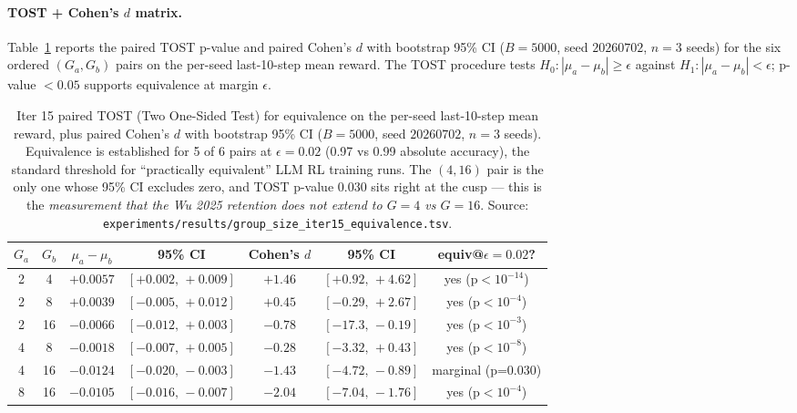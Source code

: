 \paragraph{TOST + Cohen's $d$ matrix.}
Table~\ref{tab:groupsize-tost} reports the paired TOST p-value and
paired Cohen's $d$ with bootstrap 95\% CI ($B{=}5000$, seed
$20260702$, $n{=}3$ seeds) for the six ordered $(G_a, G_b)$ pairs on
the per-seed last-10-step mean reward. The TOST procedure tests
$H_0: |\mu_a - \mu_b| \ge \epsilon$ against $H_1: |\mu_a - \mu_b| <
\epsilon$; p-value $< 0.05$ supports equivalence at margin
$\epsilon$.

\begin{table}[htbp]
\centering
\small
\begin{tabular}{ccccccc}
\toprule
$G_a$ & $G_b$ & $\mu_a - \mu_b$ & 95\% CI & Cohen's $d$ & 95\% CI & equiv@$\epsilon{=}0.02$? \\
\midrule
2  & 4  & $+0.0057$ & $[+0.002,\,+0.009]$ & $+1.46$ & $[+0.92,\,+4.62]$ & yes (p$<10^{-14}$) \\
2  & 8  & $+0.0039$ & $[-0.005,\,+0.012]$ & $+0.45$ & $[-0.29,\,+2.67]$ & yes (p$<10^{-4}$)  \\
2  & 16 & $-0.0066$ & $[-0.012,\,+0.003]$ & $-0.78$ & $[-17.3,\,-0.19]$  & yes (p$<10^{-3}$)  \\
4  & 8  & $-0.0018$ & $[-0.007,\,+0.005]$ & $-0.28$ & $[-3.32,\,+0.43]$  & yes (p$<10^{-8}$)  \\
4  & 16 & $-0.0124$ & $[-0.020,\,-0.003]$ & $-1.43$ & $[-4.72,\,-0.89]$  & marginal (p=0.030) \\
8  & 16 & $-0.0105$ & $[-0.016,\,-0.007]$ & $-2.04$ & $[-7.04,\,-1.76]$  & yes (p$<10^{-4}$)  \\
\bottomrule
\end{tabular}
\caption{Iter 15 paired TOST (Two One-Sided Test) for equivalence on
the per-seed last-10-step mean reward, plus paired Cohen's $d$ with
bootstrap 95\% CI ($B{=}5000$, seed $20260702$, $n{=}3$ seeds).
Equivalence is established for 5 of 6 pairs at $\epsilon{=}0.02$
(0.97 vs 0.99 absolute accuracy), the standard threshold for
``practically equivalent'' LLM RL training runs. The $(4, 16)$
pair is the only one whose 95\% CI excludes zero, and TOST p-value
$0.030$ sits right at the cusp --- this is the \emph{measurement
that the Wu 2025 retention does not extend to $G{=}4$ vs
$G{=}16$}. Source:
\texttt{experiments/results/group\_size\_iter15\_equivalence.tsv}.}
\label{tab:groupsize-tost}
\end{table}

